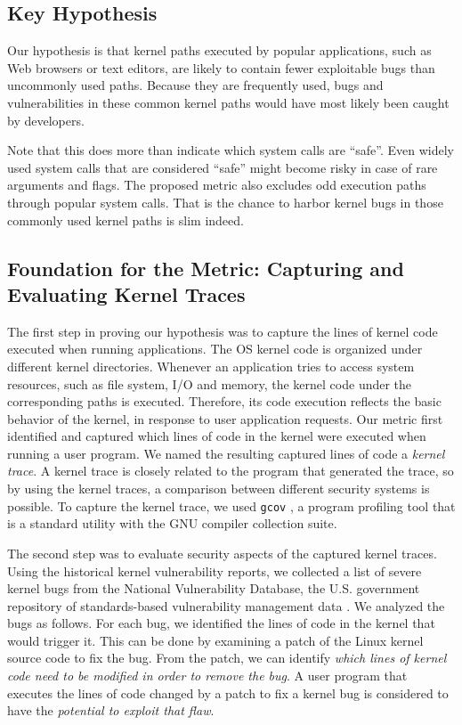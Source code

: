 \subsection{Key Hypothesis}

Our hypothesis is that kernel paths executed by popular applications, such as Web browsers or text editors, 
are likely to contain fewer exploitable bugs than uncommonly used paths. Because they are frequently used, 
bugs and vulnerabilities in these common kernel paths would have most likely been caught by developers.

Note that this does more than indicate which system calls are ``safe''.
Even widely used system calls that are considered ``safe'' might become risky in case of rare arguments and flags. 
The proposed metric also excludes odd execution paths through popular system calls. 
That is the chance to harbor kernel bugs in those commonly used kernel paths is slim indeed.


\subsection{Foundation for the Metric: Capturing and Evaluating Kernel Traces}

The first step in proving our hypothesis was to capture the lines of kernel
code executed
when running applications. The OS kernel code is organized under different
kernel directories.
Whenever an application tries to access system resources, such as file
system, I/O and memory, the kernel code under the corresponding paths is executed. Therefore,
its code execution reflects the basic behavior of the kernel, in response
to user application requests.
Our metric first identified and captured which lines of code in the kernel
were executed
when running a user program. We named the resulting captured lines of
code a \textit{kernel trace}.
A kernel trace is closely related to the program that generated the trace, so
by using the kernel traces, a comparison between different
security systems is possible.
To capture the kernel trace, we used \texttt{gcov} \cite{gcov}, a program profiling
tool that is a standard utility with the GNU compiler collection
suite.


The second step was to evaluate security aspects of the captured kernel traces.%
Using the historical kernel vulnerability reports, we collected a list of
severe kernel bugs from
the National Vulnerability Database, the U.S. government repository of
standards-based vulnerability management data \cite{NVD}. We analyzed the bugs as
follows. For each bug, we identified the lines of code
in the kernel that would trigger it. This can be done by examining
a patch of the Linux kernel source code to fix the bug. From the patch,
we can identify \textit{which lines of kernel code need to be modified in order to
remove the bug}.
A user program that executes the lines of code changed by a patch to fix a
kernel bug is considered to have the \textit{potential to exploit that flaw}.

